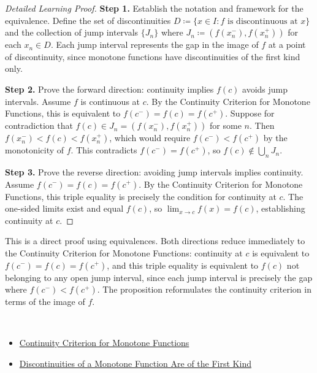 \begin{proof}[Detailed Learning Proof]
\LRAProofBodyStart

\textbf{Step 1.} Establish the notation and framework for the equivalence. Define the set of discontinuities $D \coloneqq \{x \in I : f \text{ is discontinuous at } x\}$ and the collection of jump intervals $\{J_n\}$ where $J_n \coloneqq (f(x_n^{-}), f(x_n^{+}))$ for each $x_n \in D$. Each jump interval represents the gap in the image of $f$ at a point of discontinuity, since monotone functions have discontinuities of the first kind only.

\textbf{Step 2.} Prove the forward direction: continuity implies $f(c)$ avoids jump intervals. Assume $f$ is continuous at $c$. By the Continuity Criterion for Monotone Functions, this is equivalent to $f(c^{-}) = f(c) = f(c^{+})$. Suppose for contradiction that $f(c) \in J_n = (f(x_n^{-}), f(x_n^{+}))$ for some $n$. Then $f(x_n^{-}) < f(c) < f(x_n^{+})$, which would require $f(c^{-}) < f(c^{+})$ by the monotonicity of $f$. This contradicts $f(c^{-}) = f(c^{+})$, so $f(c) \notin \bigcup_n J_n$.

\textbf{Step 3.} Prove the reverse direction: avoiding jump intervals implies continuity. Assume $f(c^{-}) = f(c) = f(c^{+})$. By the Continuity Criterion for Monotone Functions, this triple equality is precisely the condition for continuity at $c$. The one-sided limits exist and equal $f(c)$, so $\lim_{x \to c} f(x) = f(c)$, establishing continuity at $c$.
\end{proof}

\begin{remark*}
This is a direct proof using equivalences. Both directions reduce immediately to the Continuity Criterion for Monotone Functions: continuity at $c$ is equivalent to $f(c^{-}) = f(c) = f(c^{+})$, and this triple equality is equivalent to $f(c)$ not belonging to any open jump interval, since each jump interval is precisely the gap where $f(c^{-}) < f(c^{+})$. The proposition reformulates the continuity criterion in terms of the image of $f$.
\end{remark*}

\begin{remark*}[Dependencies]~\\
\begin{itemize}
  \item \hyperref[cor:monotone-continuity-criterion]{Continuity Criterion for Monotone Functions}
  \item \hyperref[prop:monotone-discontinuities-first-kind]{Discontinuities of a Monotone Function Are of the First Kind}
\end{itemize}
\end{remark*}
